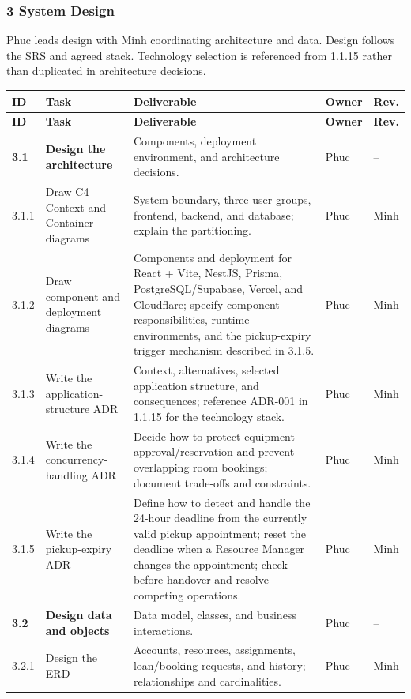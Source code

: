 \documentclass[11pt]{article}
\renewcommand{\arraystretch}{1.18}
\begin{document}
\subsubsection*{3 System Design}
Phuc leads design with Minh coordinating architecture and data. Design follows the SRS and agreed stack. Technology selection is referenced from 1.1.15 rather than duplicated in architecture decisions.
\footnotesize\setlength{\tabcolsep}{2.5pt}\renewcommand{\arraystretch}{1.08}
\begin{longtable}{@{}L{1.15cm}L{3.2cm}L{7.6cm}L{1.4cm}L{1.4cm}@{}}
\toprule
\textbf{ID} & \textbf{Task} & \textbf{Deliverable} & \textbf{Owner} & \textbf{Rev.} \\
\midrule\endfirsthead\toprule
\textbf{ID} & \textbf{Task} & \textbf{Deliverable} & \textbf{Owner} & \textbf{Rev.} \\
\midrule\endhead
\textbf{3.1} & \textbf{Design the architecture} & Components, deployment environment, and architecture decisions. & Phuc & -- \\
3.1.1 & Draw C4 Context and Container diagrams & System boundary, three user groups, frontend, backend, and database; explain the partitioning. & Phuc & Minh \\
3.1.2 & Draw component and deployment diagrams & Components and deployment for React + Vite, NestJS, Prisma, PostgreSQL/Supabase, Vercel, and Cloudflare; specify component responsibilities, runtime environments, and the pickup-expiry trigger mechanism described in 3.1.5. & Phuc & Minh \\
3.1.3 & Write the application-structure ADR & Context, alternatives, selected application structure, and consequences; reference ADR-001 in 1.1.15 for the technology stack. & Phuc & Minh \\
3.1.4 & Write the concurrency-handling ADR & Decide how to protect equipment approval/reservation and prevent overlapping room bookings; document trade-offs and constraints. & Phuc & Minh \\
3.1.5 & Write the pickup-expiry ADR & Define how to detect and handle the 24-hour deadline from the currently valid pickup appointment; reset the deadline when a Resource Manager changes the appointment; check before handover and resolve competing operations. & Phuc & Minh \\
\textbf{3.2} & \textbf{Design data and objects} & Data model, classes, and business interactions. & Phuc & -- \\
3.2.1 & Design the ERD & Accounts, resources, assignments, loan/booking requests, and history; relationships and cardinalities. & Phuc & Minh \\

\end{longtable}
\end{document}
